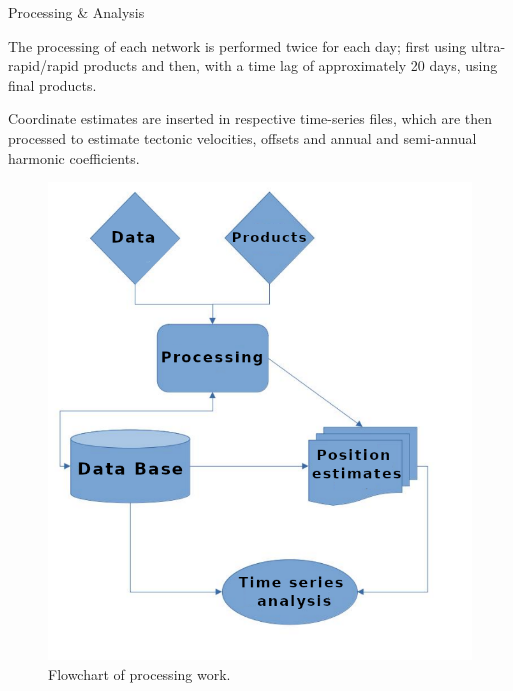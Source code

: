 \documentclass[final,a0,portrait]{beamer}
\newlength{\onecolwid}
\begin{document}
\begin{frame}[t]
\begin{columns}[t]
\begin{column}{\onecolwid}
\begin{block}{Processing \& Analysis}
{The processing of each network is performed twice for each day; first using ultra-rapid/rapid products and then, with a time lag of approximately 20 days, using final products. 

Coordinate estimates are inserted in respective time-series files, which are then processed to estimate tectonic velocities, offsets and annual and semi-annual harmonic coefficients.
}

\begin{figure}
  \centering
  \includegraphics[width=0.7\onecolwid]{proc_flowchart.png}
  \caption{Flowchart of processing work.}
  \label{fig:proc}
\end{figure}
\end{block}


\end{column}
\end{columns}
\end{frame}
\end{document}
